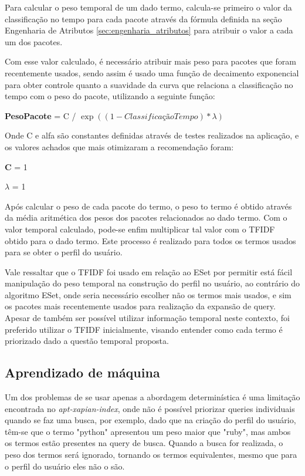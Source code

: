 Para calcular o peso temporal de um dado termo, calcula-se primeiro o valor da
classificação no tempo para cada pacote através da fórmula definida na seção
Engenharia de Atributos \ref{sec:engenharia_atributos} para atribuir o valor
a cada um dos pacotes.

Com esse valor calculado, é necessário atribuir mais peso para pacotes que
foram recentemente usados, sendo assim é usado uma função de decaimento
exponencial para obter controle quanto a suavidade da curva que relaciona
a classificação no tempo com o peso do pacote, utilizando a seguinte função:

\textbf{PesoPacote} = C / $\exp\left(({1 - ClassificaçãoTempo}) * {\lambda}\right)$

Onde C e alfa são constantes definidas através de testes realizados na
aplicação, e os valores achados que mais otimizaram a recomendação foram:

\textbf{C} = 1

\textbf{$\lambda$} = 1

Após calcular o peso de cada pacote do termo, o peso to termo é obtido
através da média aritmética dos pesos dos pacotes relacionados ao dado termo.
Com o valor temporal calculado, pode-se enfim multiplicar tal valor com o TFIDF
obtido para o dado termo. Este processo é realizado para todos os termos usados
para se obter o perfil do usuário.

Vale ressaltar que o TFIDF foi usado em relação ao ESet por permitir está fácil
manipulação do peso temporal na construção do perfil no usuário, ao contrário do
algoritmo ESet, onde seria necessário escolher não os termos mais usados, e sim
os pacotes mais recentemente usados para realização da expansão de query. Apesar
de também ser possível utilizar informação temporal neste contexto, foi
preferido utilizar o TFIDF inicialmente, visando entender como cada termo é
priorizado dado a questão temporal proposta.

\subsection{Aprendizado de máquina}

Um dos problemas de se usar apenas a abordagem determinística é uma limitação
encontrada no \textit{apt-xapian-index}, onde não é possível priorizar queries
individuais quando se faz uma busca, por exemplo, dado que na criação do perfil
do usuário, têm-se que o termo "python" apresentou um peso maior que "ruby", mas
ambos os termos estão presentes na query de busca. Quando a busca for realizada,
o peso dos termos será ignorado, tornando os termos equivalentes, mesmo que para
o perfil do usuário eles não o são.

